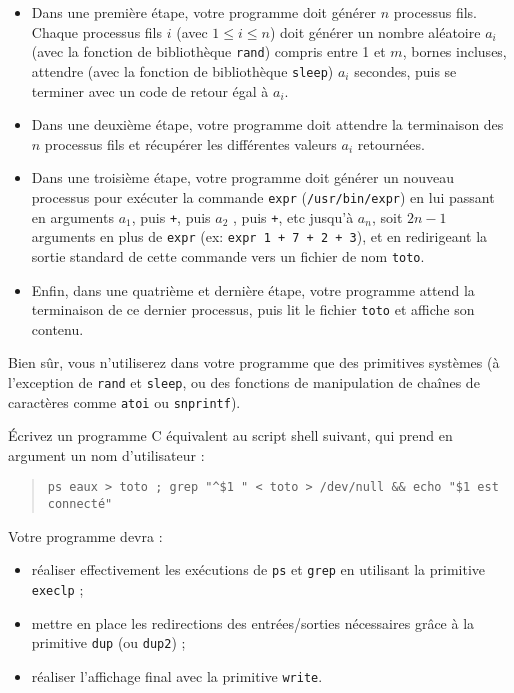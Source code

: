 \begin {itemize}
    \item Dans une première étape, votre programme doit générer
	$n$ processus fils. Chaque processus fils $i$ (avec $1 \leq
	i \leq n$) doit générer un nombre aléatoire $a_i$ (avec la
	fonction de bibliothèque \texttt {rand}) compris entre 1 et $m$,
	bornes incluses, attendre (avec la fonction de bibliothèque
	\texttt {sleep}) $a_i$ secondes, puis se terminer avec un code de
	retour égal à $a_i$.

    \item Dans une deuxième étape, votre programme doit attendre la
	terminaison des $n$ processus fils et récupérer les différentes
	valeurs $a_i$ retournées.

    \item Dans une troisième étape, votre programme doit générer un
	nouveau processus pour exécuter la commande \texttt {expr}
	(\texttt {/usr/bin/expr}) en lui passant en arguments $a_1$,
	puis \texttt {+}, puis $a_2$ , puis \texttt {+}, etc jusqu'à
	$a_n$, soit $2n-1$ arguments en plus de \texttt {expr} (ex:
	\verb*|expr 1 + 7 + 2 + 3|), et en redirigeant la sortie
	standard de cette commande vers un fichier de nom \texttt {toto}.

    \item Enfin, dans une quatrième et dernière étape, votre programme
	attend la terminaison de ce dernier processus, puis lit le
	fichier \texttt {toto} et affiche son contenu.

\end {itemize}

Bien sûr, vous n'utiliserez dans votre programme que des primitives
systèmes (à l'exception de \texttt {rand} et \texttt {sleep}, ou des
fonctions de manipulation de chaînes de caractères comme \texttt {atoi}
ou \texttt {snprintf}).


\question

Écrivez un programme C équivalent au script shell suivant, qui prend
en argument un nom d'utilisateur :

\begin {quote}
    \verb:ps eaux > toto ; grep "^$1 " < toto > /dev/null && echo "$1 est connecté":
\end {quote}

Votre programme devra :

\begin {itemize}
    \item réaliser effectivement les exécutions de \texttt {ps} et
	\texttt {grep} en utilisant la primitive \texttt {execlp} ;

    \item mettre en place les redirections des entrées/sorties
	nécessaires grâce à la primitive \texttt {dup} (ou \texttt
	{dup2}) ;

    \item réaliser l'affichage final avec la primitive \texttt {write}.

\end {itemize}


